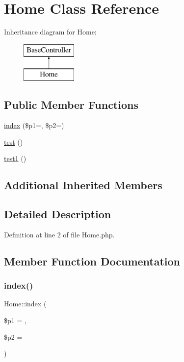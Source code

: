 \hypertarget{class_home}{}\section{Home Class Reference}
\label{class_home}
Inheritance diagram for Home\+:\begin{figure}[H]
\begin{center}
\leavevmode
\includegraphics[height=2.000000cm]{class_home}
\end{center}
\end{figure}
\subsection*{Public Member Functions}
\begin{DoxyCompactItemize}
\item 
\hyperlink{class_home_ac664a1815e75ae32c2e18fac51cb2585}{index} (\$p1=\textquotesingle{}\textquotesingle{}, \$p2=\textquotesingle{}\textquotesingle{})
\item 
\hyperlink{class_home_ae007dc6f5e385f932058822aeb094644}{test} ()
\item 
\hyperlink{class_home_ad3fffcdc6c29ee47c82e72c20b227c7e}{test1} ()
\end{DoxyCompactItemize}
\subsection*{Additional Inherited Members}


\subsection{Detailed Description}


Definition at line 2 of file Home.\+php.



\subsection{Member Function Documentation}
\hypertarget{class_home_ac664a1815e75ae32c2e18fac51cb2585}{}\label{class_home_ac664a1815e75ae32c2e18fac51cb2585} 
\subsubsection{\texorpdfstring{index()}{index()}}
{\footnotesize\ttfamily Home\+::index (\begin{DoxyParamCaption}\item[{}]{\$p1 = {\ttfamily \textquotesingle{}\textquotesingle{}},  }\item[{}]{\$p2 = {\ttfamily \textquotesingle{}\textquotesingle{}} }\end{DoxyParamCaption})}



